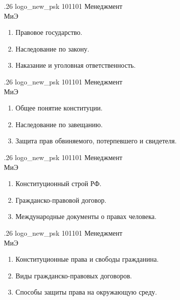 \documentclass[
	12pt,
	a4paper,
	]
	{article}
\newcommand{\shapkFull}{
	\shapk
		{.26}
		{logo_new_psk}
		{101101}
		{Менеджмент\\}
		{МиЭ}
		{}
}
\begin{document}
\newpage


\shapkFull
\setcounter{zad}{0}

\begin{enumerate}
	\item Правовое государство.

	\item Наследование по закону.

	\item Наказание и уголовная ответственность.

\end{enumerate}

\newpage


\shapkFull
\setcounter{zad}{0}

\begin{enumerate}
	\item Общее понятие конституции.

	\item Наследование по завещанию.

	\item Защита прав обвиняемого, потерпевшего и свидетеля.

\end{enumerate}

\newpage


\shapkFull
\setcounter{zad}{0}

\begin{enumerate}
	\item Конституционный строй РФ.

	\item Гражданско-правовой договор.

	\item Международные документы о правах человека.

\end{enumerate}

\newpage


\shapkFull
\setcounter{zad}{0}

\begin{enumerate}
	\item Конституционные права и свободы гражданина.

	\item Виды гражданско-правовых договоров.

	\item Способы защиты права на окружающую среду.

\end{enumerate}
\end{document}

